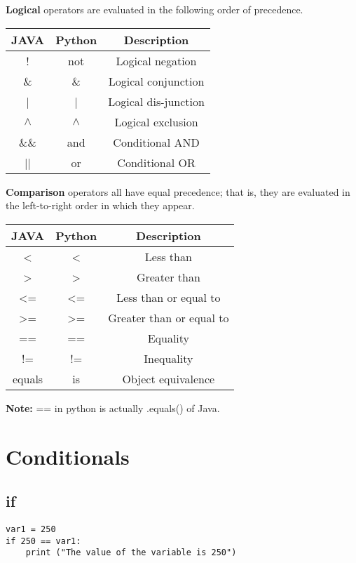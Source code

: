 \documentclass[a4paper,9pt]{extarticle}
\begin{document}
\begin{multicols*}{2}
\textbf{Logical} operators are evaluated in the following order of precedence.

\begin{center}
 \begin{tabular}{||c | c | c||}
 \hline
 \textbf{JAVA} & \textbf{Python} & \textbf{Description}\\ [1ex]
 \hline\hline
  ! & not & Logical negation\\
 \hline
 \&  & \& & Logical conjunction\\
 \hline
 | & | & Logical dis-junction\\
 \hline
 $\wedge$ & $\wedge$ & Logical exclusion \\
 \hline
  \&\& & and & Conditional AND\\
 \hline
  || & or & Conditional OR\\
 \hline
\end{tabular}
\end{center}

\textbf{Comparison} operators all have equal precedence; that is, they are evaluated in the left-to-right order in which they appear.

\begin{center}
 \begin{tabular}{||c | c | c||}
 \hline
 \textbf{JAVA} & \textbf{Python} & \textbf{Description}\\ [1ex]
 \hline\hline
 < & < & Less than\\
 \hline
 > & > & Greater than\\
 \hline
 <= & <= & Less than or equal to \\
 \hline
  >= & >= & Greater than or equal to\\
 \hline
  == & == & Equality\\
 \hline
 != & != & Inequality\\
 \hline
 equals & is & Object equivalence \\
 \hline
\end{tabular}
\end{center}
\textbf{Note: } == in python is actually .equals() of Java.
\vspace{5 mm}

\section{Conditionals}
\subsection{if}
\begin{lstlisting}
var1 = 250
if 250 == var1:
    print ("The value of the variable is 250")
\end{lstlisting}
\vspace{5 mm}


\end{multicols*}
\end{document}

